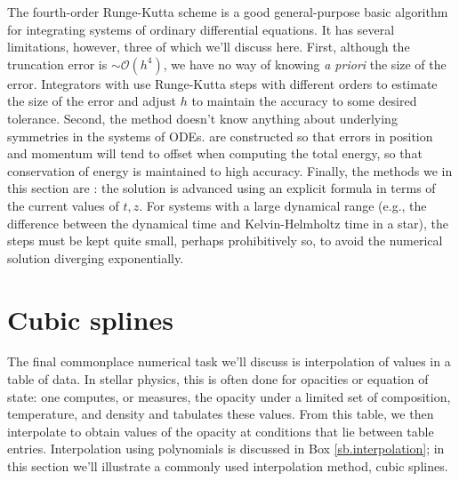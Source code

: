 The fourth-order Runge-Kutta scheme is a good general-purpose basic algorithm for integrating systems of ordinary differential equations. It has several limitations, however, three of which we'll discuss here. First, although the truncation error is $\sim\mathcal{O}(h^{4})$, we have no way of knowing \emph{a priori} the size of the error. Integrators with  use Runge-Kutta steps with different orders to estimate the size of the error and adjust $h$ to maintain the accuracy to some desired tolerance. Second, the method doesn't know anything about underlying symmetries in the systems of ODEs.  are constructed so that errors in position and momentum will tend to offset when computing the total energy, so that conservation of energy is maintained to high accuracy. Finally, the methods we in this section are : the solution is advanced using an explicit formula in terms of the current values of $t,z$. For systems with a large dynamical range (e.g., the difference between the dynamical time and Kelvin-Helmholtz time in a star), the steps must be kept quite small, perhaps prohibitively so, to avoid the numerical solution diverging exponentially.

\section{Cubic splines}
The final commonplace numerical task we'll discuss is interpolation of values in a table of data. In stellar physics, this is often done for opacities or equation of state: one computes, or measures, the opacity under a limited set of composition, temperature, and density and tabulates these values. From this table, we then interpolate to obtain values of the opacity at conditions that lie between table entries. Interpolation using polynomials is discussed in Box \ref{sb.interpolation}; in this section we'll illustrate a commonly used interpolation method, cubic splines.

